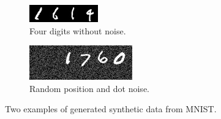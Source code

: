 
\begin{figure}
    \centering
    \begin{subfigure}[b]{0.45\textwidth}
        \centering
        \includegraphics[scale=2.0]{resources/mnist4.jpg}
        \caption{Four digits without noise.
        }
        \label{fig:mnist4}
    \end{subfigure}%
    \begin{subfigure}[b]{0.45\textwidth}
        \centering
        \includegraphics[scale=2.0]{resources/random_pad.jpg}
        \caption{Random position and dot noise.
        }
        \label{fig:mnist_random_pad}
    \end{subfigure}
    \caption{Two examples of generated synthetic data from MNIST.}
\end{figure}
